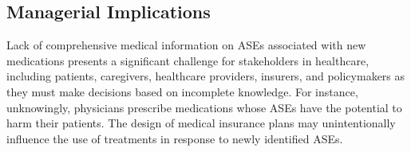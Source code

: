 \documentclass[referee,bst/sn-basic]{sn-jnl}%
\theoremstyle{thmstyletwo}%
\theoremstyle{thmstylethree}%
\begin{document}

\subsection{Managerial Implications}
Lack of comprehensive medical information on ASEs associated with new medications presents a significant challenge for stakeholders in healthcare, including patients, caregivers, healthcare providers, insurers, and policymakers as they must make decisions based on incomplete knowledge.
For instance, unknowingly, physicians prescribe medications whose ASEs have the potential to harm their patients.
The design of medical insurance plans may unintentionally influence the use of treatments in response to newly identified ASEs.
\end{document}
